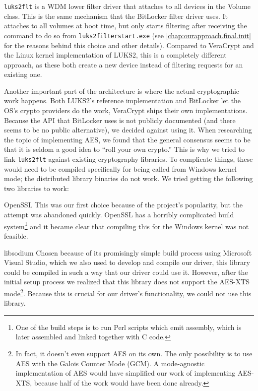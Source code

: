 \texttt{luks2flt} is a WDM lower filter driver that attaches to all devices in the Volume class. This is the same mechanism that the BitLocker filter driver uses. It attaches to all volumes at boot time, but only starts filtering after receiving the command to do so from \texttt{luks2filterstart.exe} (see \autoref{chap:ourapproach.final.init} for the reasons behind this choice and other details). Compared to VeraCrypt and the Linux kernel implementation of LUKS2, this is a completely different approach, as these both create a new device instead of filtering requests for an existing one.


Another important part of the architecture is where the actual cryptographic work happens. Both LUKS2's reference implementation and BitLocker let the OS's crypto providers do the work, VeraCrypt ships their own implementations. Because the API that BitLocker uses is not publicly documented (and there seems to be no public alternative), we decided against using it. When researching the topic of implementing AES, we found that the general consensus seems to be that it is seldom a good idea to ``roll your own crypto.'' This is why we tried to link \texttt{luks2flt} against existing cryptography libraries. To complicate things, these would need to be compiled specifically for being called from Windows kernel mode; the distributed library binaries do not work. We tried getting the following two libraries to work:
\begin{descitemize}
	\item[OpenSSL] This was our first choice because of the project's popularity, but the attempt was abandoned quickly. OpenSSL has a horribly complicated build system\footnote{\label{fn:ourapproach.final.opensslbuild} One of the build steps is to run Perl scripts which emit assembly, which is later assembled and linked together with C code.} and it became clear that compiling this for the Windows kernel was not feasible.
	\item[libsodium] Chosen because of its promisingly simple build process using Microsoft Visual Studio, which we also used to develop and compile our driver, this library could be compiled in such a way that our driver could use it. However, after the initial setup process we realized that this library does not support the AES-XTS mode\footnote{\label{fn:ourapproach.final.libsodium} In fact, it doesn't even support AES on its own. The only possibility is to use AES with the Galois Counter Mode (GCM). A mode-agnostic implementation of AES would have simplified our work of implementing AES-XTS, because half of the work would have been done already.}. Because this is crucial for our driver's functionality, we could not use this library.
\end{descitemize}

